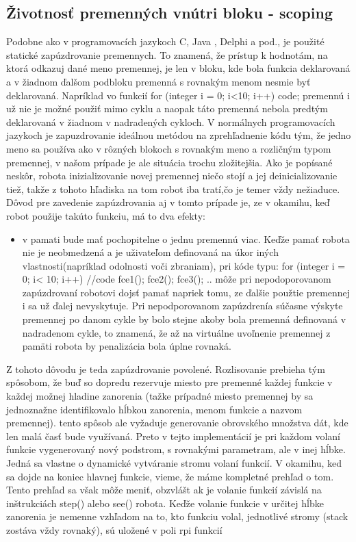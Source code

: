 \subsection{Životnosť premenných vnútri bloku - scoping}
\indent Podobne ako v programovacích jazykoch C, Java , Delphi a pod., je použité statické zapúzdrovanie premennych. To znamená, že prístup k hodnotám, na ktorá odkazuj dané meno premennej, je len v bloku, kde bola funkcia deklarovaná a v žiadnom ďalšom podbloku premenná s rovnakým menom nesmie byť deklarovaná. Napríklad vo funkcií
for (integer i = 0; i<10; i++)
{
	code;
}
premennú i už nie je možné použiť mimo cyklu a naopak táto premenná nebola predtým deklarovaná v žiadnom v nadradených cykloch. V normálnych programovacích jazykoch je zapuzdrovanie ideálnou metódou na zprehľadnenie kódu tým, že jedno meno sa používa ako v rôzných blokoch s rovnakým meno a rozličným typom premennej, v našom prípade je ale situácia trochu zložitejšia. Ako je popísané neskôr, robota inizializovanie novej premennej niečo stojí a jej deinicializovanie tiež, takže z tohoto hľadiska na tom robot iba tratí,čo je temer vždy nežiaduce. Dôvod pre zavedenie zapúzdrovania aj v tomto prípade je, ze v okamihu, keď robot použije takúto funkciu, má to dva efekty: \\
		\begin{itemize}
		\item v pamati bude mať pochopitelne o jednu premennú viac. Keďže pamať robota nie je neobmedzená a je uživateľom definovaná na úkor iných vlastnosti(napríklad odolnosti voči zbraniam), pri kóde typu:
for (integer i = 0; i< 10; i++)
{
	//code
}
fce1();
fce2();
fce3();
..
môže pri nepodoporovanom zapúzdrovaní robotovi dojsť pamať napriek tomu, ze ďalšie použtie premennej i sa už ďalej nevyskytuje. Pri nepodporovanom zapúzdrenía súčasne výskyte premennej po danom cykle by bolo stejne akoby bola premenná definovaná v nadradenom cykle, to znamená, že až na virtuálne uvoľnenie premennej z pamäti robota by penalizácia bola úplne rovnaká.
\end{itemize}
Z tohoto dôvodu je teda zapúzdrovanie povolené. Rozlisovanie prebieha tým spôsobom, že buď so dopredu rezervuje miesto pre premenné každej funkcie v každej možnej hladine zanorenia (tažke prípadné miesto premennej by sa jednoznažne identifikovalo hĺbkou zanorenia, menom funkcie a nazvom premennej). tento spôsob ale vyžaduje generovanie obrovského množstva dát, kde len malá časť bude využívaná. Preto v tejto implementácií je pri každom volaní funkcie vygenerovaný nový podstrom, s rovnakými parametram, ale v inej hĺbke. Jedná sa vlastne o dynamické vytváranie stromu volaní funkcií. V okamihu, ked sa dojde na koniec hlavnej funkcie, vieme, že máme kompletné prehľad o tom. Tento prehľad sa však môže meniť, obzvlášt ak je volanie funkcií závislá na inštrukciách step() alebo see() robota. Keďže volanie funkcie v určitej hĺbke zanorenia je nemenne vzhľadom na to, kto funkciu volal, jednotlivé stromy (stack zostáva vždy rovnaký), sú uložené v poli rpi funkcií
